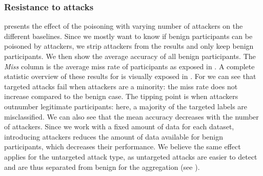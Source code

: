 \subsubsection{Resistance to attacks\label{sec:eval.results.attacks}}
 presents the effect of the poisoning with varying number of attackers on the different baselines. 
Since we mostly want to know if benign participants can be poisoned by attackers, we strip attackers from the results and only keep benign participants.  
We then show the average accuracy of all benign participants.
The \emph{Miss} column is the average miss rate of participants as exposed in .
A complete statistic overview of these results for \thecontrib is  visually exposed in .
For \thecontrib we can see that targeted attacks fail when attackers are a minority: the miss rate does not increase compared to the benign case.
The tipping point is when attackers outnumber legitimate participants: here, a majority of the targeted labels are misclassified. 
We can also see that the mean accuracy decreases with the number of attackers. Since we work with a fixed amount of data for each dataset, introducing attackers reduces the amount of data available for benign participants, which decreases their performance. 
We believe the same effect applies for the untargeted attack type, as untargeted attacks are easier to detect and are thus separated from benign for the aggregation (see ).

